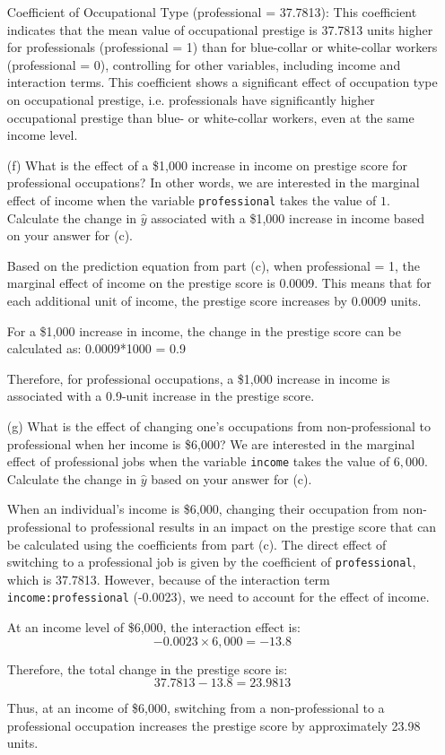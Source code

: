\documentclass[12pt,letterpaper]{article}
\begin{document}
\begin{enumerate}
	Coefficient of Occupational Type (professional = 37.7813): This coefficient indicates that the mean value of occupational prestige is 37.7813 units higher for professionals (professional = 1) than for blue-collar or white-collar workers (professional = 0), controlling for other variables, including income and interaction terms.
	This coefficient shows a significant effect of occupation type on occupational prestige, i.e. professionals have significantly higher occupational prestige than blue- or white-collar workers, even at the same income level.
	
	
	\newpage
	\item [(f)]
	What is the effect of a \$1,000 increase in income on prestige score for professional occupations? In other words, we are interested in the marginal effect of income when the variable \texttt{professional} takes the value of $1$. Calculate the change in $\hat{y}$ associated with a \$1,000 increase in income based on your answer for (c).
	
	Based on the prediction equation from part (c), when professional = 1, the marginal effect of income on the prestige score is 0.0009. This means that for each additional unit of income, the prestige score increases by 0.0009 units. 
	
	For a \$1,000 increase in income, the change in the prestige score can be calculated as:
	   0.0009*1000 = 0.9
	
	Therefore, for professional occupations, a \$1,000 increase in income is associated with a 0.9-unit increase in the prestige score.
	\vspace{.5cm}
	
	
	
	\item [(g)]
	What is the effect of changing one's occupations from non-professional to professional when her income is \$6,000? We are interested in the marginal effect of professional jobs when the variable \texttt{income} takes the value of $6,000$. Calculate the change in $\hat{y}$ based on your answer for (c).
	
	When an individual’s income is \$6,000, changing their occupation from non-professional to professional results in an impact on the prestige score that can be calculated using the coefficients from part (c).
	The direct effect of switching to a professional job is given by the coefficient of \texttt{professional}, which is 37.7813. However, because of the interaction term \texttt{income:professional} (-0.0023), we need to account for the effect of income. 
	
	At an income level of \$6,000, the interaction effect is:
	\[
	-0.0023 \times 6,000 = -13.8
	\]
	
	Therefore, the total change in the prestige score is:
	\[
	37.7813 - 13.8 = 23.9813
	\]
	
	
	Thus, at an income of \$6,000, switching from a non-professional to a professional occupation increases the prestige score by approximately 23.98 units.
	
	
	
\end{enumerate}
\end{document}
